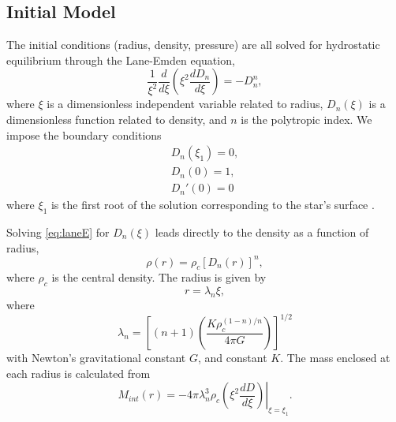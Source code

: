\documentclass[12pt]{article}
\begin{document}
\subsection{Initial Model}
The initial conditions (radius, density, pressure) are all solved for hydrostatic equilibrium through the Lane-Emden equation,
\begin{equation}\label{eq:laneE}
    \frac{1}{\xi^{2}}\frac{d}{d\xi}\left( \xi^{2}\frac{dD_{n}}{d\xi} \right)=-D_{n}^{n},
\end{equation}
where $\xi$ is a dimensionless independent variable related to radius,  $D_{n}(\xi)$ is a
dimensionless function related to density, and $n$ is the polytropic index. We impose the
boundary conditions
\begin{equation}
\begin{split}
    D_{n}(\xi_{1})=0, \\
    D_{n}(0) = 1, \\
    D_{n}'(0) = 0
\end{split}
\end{equation}
where $\xi_{1}$ is the first root of the solution corresponding to the star's surface \citep{bob}.

Solving \autoref{eq:laneE} for $D_{n}(\xi)$ leads directly to the density as a function of radius,
\begin{equation}
    \rho(r)=\rho_{c}[D_{n}(r)]^{n},
\end{equation}
where $\rho_{c}$ is the central density.
The radius is given by
\begin{equation}
    r = \lambda_{n} \xi,
\end{equation}
where
\begin{equation}
    \lambda_{n}=\left[(n+1)\left( \frac{K \rho_{c}^{(1-n)/n}}{4\pi G} \right) \right]^{1/2}
\end{equation}
with Newton's gravitational constant $G$, and constant $K$.
The mass enclosed at each radius is calculated from
\begin{equation}
    M_{int}(r) = -4 \pi \lambda_{n}^{3} \rho_{c} \left.\left(\xi^2 \frac{dD}{d\xi}\right)\right|_{\xi=\xi_1}.
\end{equation}
\end{document}
